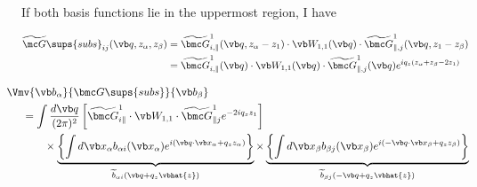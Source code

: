 \documentclass[letterpaper]{article}
\renewcommand{\wt}{\widetilde}
\begin{document}
If both basis functions lie in the uppermost region,  I have

\begin{align*}
\wt{\mc G}\sups{subs}_{ij}(\vb q, z_\alpha, z_\beta)
&=\wt{\bmc G}^{1}_{i,\parallel}(\vb q, z_\alpha-z_1)
  \cdot \vb W_{1,1}(\vb q)\cdot
  \wt{\bmc G}^{1}_{\parallel,j}(\vb q, z_1-z_\beta)
\\
&=\wt{\bmc G}^{1}_{i,\parallel}(\vb q)
  \cdot \vb W_{1,1}(\vb q)\cdot
  \wt{\bmc G}^{1}_{\parallel,j}(\vb q)
  e^{iq_z(z_\alpha + z_\beta - 2z_1)}
\end{align*}

\begin{align}
&\hspace{-0.2in}
\Vmv{\vb b_\alpha}{\bmc G\sups{subs}}{\vb b_\beta}
\\
&=\int \frac{d\vb q}{(2\pi)^2}
  \left[
         \wt{\bmc G}^1_{i\parallel}
   \cdot \vb W_{1,1}
   \cdot \wt{\bmc G}^1_{\parallel j}e^{-2iq_z z_1}
  \right]
\\
&\qquad
 \times
   \underbrace{
   \left\{ \int d\vb x_\alpha
            b_{\alpha i}(\vb x_\alpha)
            e^{i(\vb q \cdot \vb x_\alpha + q_z z_\alpha)}
   \right\}
              }_{\wt{b}_{\alpha i}(\vb q + q_z\vbhat{z})}
  \times
   \underbrace{
   \left\{ \int d\vb x_\beta
            b_{\beta j}(\vb x_\beta)
            e^{i(-\vb q \cdot \vb x_\beta + q_z z_\beta)}
   \right\}
              }_{\wt{b}_{\beta j}(-\vb q + q_z\vbhat{z})}
\end{align}
\end{document}

